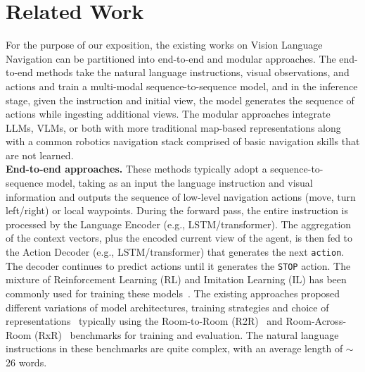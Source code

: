 \section{Related Work}
For the purpose of our exposition, the existing works on Vision Language Navigation can be partitioned into end-to-end and modular approaches. The end-to-end methods take the natural language instructions, visual observations, and actions and train a multi-modal sequence-to-sequence model, and in the inference stage, given the instruction and initial view, the model generates the sequence of actions while ingesting additional views.  
The modular approaches integrate LLMs, VLMs, or both with more traditional map-based representations along with a common robotics navigation stack comprised of basic navigation skills that are not learned.  \\
\noindent
\textbf{End-to-end approaches.} These methods typically adopt a sequence-to-sequence model, taking as an input the language instruction and visual information and outputs the sequence of low-level navigation actions (move, turn left/right) or local waypoints. During the forward pass, the entire instruction is processed by the Language Encoder (e.g., LSTM/transformer). The aggregation of the context vectors, plus the encoded current view of the agent, is then fed to the Action Decoder (e.g., LSTM/transformer) that generates the next \texttt{action}. The decoder continues to predict actions until it generates the \texttt{STOP} action. 
The mixture of Reinforcement Learning (RL) and Imitation Learning (IL) has been commonly used for training these 
models~\cite{tan2019envdrop}. 
The existing approaches proposed different variations of model architectures, training strategies and choice of representations~\cite{vln, tan2019envdrop, fried2018speaker, wang2019reinforcedxmm, vlnce, hong2021vlnrecbert, moudgil2021soat, chen2021historyhamt, georgakis2022crosscm2}  typically using the Room-to-Room (R2R)~\cite{r2r} and Room-Across-Room (RxR)~\cite{rxr} benchmarks for training and evaluation. The natural language instructions in these benchmarks are quite complex, with an average length of $\sim$ 26 words. 
